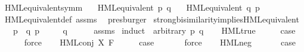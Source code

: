 \begin{isabellebody}
\isanewline
{}\isamarkupfalse%
%
\endisatagproof
{\isafoldproof}%
%
\isadelimproof
\isanewline
%
\endisadelimproof
\isanewline
{}\isamarkupfalse%
\ HML{\isacharunderscore}{\kern0pt}equivalent{\isacharunderscore}{\kern0pt}symm{\isacharcolon}{\kern0pt}\isanewline
\ \ \ {\isacartoucheopen}HML{\isacharunderscore}{\kern0pt}equivalent\ p\ q{\isacartoucheclose}\isanewline
\ \ \ {\isacartoucheopen}HML{\isacharunderscore}{\kern0pt}equivalent\ q\ p{\isacartoucheclose}\isanewline
%
\isadelimproof
\ \ %
\endisadelimproof
%
\isatagproof
{}\isamarkupfalse%
\ HML{\isacharunderscore}{\kern0pt}equivalent{\isacharunderscore}{\kern0pt}def\ assms\ \isamarkupfalse%
\ presburger%
\endisatagproof
{\isafoldproof}%
%
\isadelimproof
\isanewline
%
\endisadelimproof
%
\isadelimvisible
\isanewline
%
\endisadelimvisible
%
\isatagvisible
{}\isamarkupfalse%
\ strong{\isacharunderscore}{\kern0pt}bisimilarity{\isacharunderscore}{\kern0pt}implies{\isacharunderscore}{\kern0pt}HML{\isacharunderscore}{\kern0pt}equivalent{\isacharcolon}{\kern0pt}\isanewline
\ \ \ {\isacartoucheopen}p\ {\isasymleftrightarrow}\ q{\isacartoucheclose}\ {\isacartoucheopen}p\ {\isasymTurnstile}\ {\isasymphi}{\isacartoucheclose}\isanewline
\ \ \ {\isacartoucheopen}q\ {\isasymTurnstile}\ {\isasymphi}{\isacartoucheclose}\isanewline
\ \ \isamarkupfalse%
\ assms\isanewline
{}\isamarkupfalse%
\ {\isacharparenleft}{\kern0pt}induct\ {\isasymphi}\ arbitrary{\isacharcolon}{\kern0pt}\ p\ q{\isacharparenright}{\kern0pt}\isanewline
\ \ \isamarkupfalse%
\ HML{\isacharunderscore}{\kern0pt}true\isanewline
\ \ \isamarkupfalse%
\ \isamarkupfalse%
\ {\isacharquery}{\kern0pt}case\ \isanewline
\ \ \ \ \isamarkupfalse%
\ force\isanewline
{}\isamarkupfalse%
\isanewline
\ \ \isamarkupfalse%
\ {\isacharparenleft}{\kern0pt}HML{\isacharunderscore}{\kern0pt}conj\ X\ F{\isacharparenright}{\kern0pt}\isanewline
\ \ \isamarkupfalse%
\ \isamarkupfalse%
\ {\isacharquery}{\kern0pt}case\ \isanewline
\ \ \ \ \isamarkupfalse%
\ force\isanewline
{}\isamarkupfalse%
\isanewline
\ \ \isamarkupfalse%
\ {\isacharparenleft}{\kern0pt}HML{\isacharunderscore}{\kern0pt}neg\ {\isasymphi}{\isacharparenright}{\kern0pt}\isanewline
\ \ \isamarkupfalse%
\ \isamarkupfalse%
\ {\isacharquery}{\kern0pt}case\isanewline

\end{isabellebody}
